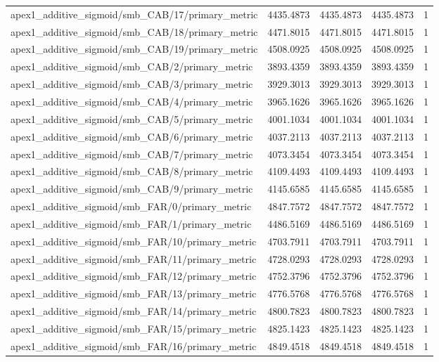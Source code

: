 \begin{table}[h]
\begin{tabular}{lrrrr}
apex1_additive_sigmoid/smb_CAB/17/primary_metric & 4435.4873 & 4435.4873 & 4435.4873 & 1 \\
apex1_additive_sigmoid/smb_CAB/18/primary_metric & 4471.8015 & 4471.8015 & 4471.8015 & 1 \\
apex1_additive_sigmoid/smb_CAB/19/primary_metric & 4508.0925 & 4508.0925 & 4508.0925 & 1 \\
apex1_additive_sigmoid/smb_CAB/2/primary_metric & 3893.4359 & 3893.4359 & 3893.4359 & 1 \\
apex1_additive_sigmoid/smb_CAB/3/primary_metric & 3929.3013 & 3929.3013 & 3929.3013 & 1 \\
apex1_additive_sigmoid/smb_CAB/4/primary_metric & 3965.1626 & 3965.1626 & 3965.1626 & 1 \\
apex1_additive_sigmoid/smb_CAB/5/primary_metric & 4001.1034 & 4001.1034 & 4001.1034 & 1 \\
apex1_additive_sigmoid/smb_CAB/6/primary_metric & 4037.2113 & 4037.2113 & 4037.2113 & 1 \\
apex1_additive_sigmoid/smb_CAB/7/primary_metric & 4073.3454 & 4073.3454 & 4073.3454 & 1 \\
apex1_additive_sigmoid/smb_CAB/8/primary_metric & 4109.4493 & 4109.4493 & 4109.4493 & 1 \\
apex1_additive_sigmoid/smb_CAB/9/primary_metric & 4145.6585 & 4145.6585 & 4145.6585 & 1 \\
apex1_additive_sigmoid/smb_FAR/0/primary_metric & 4847.7572 & 4847.7572 & 4847.7572 & 1 \\
apex1_additive_sigmoid/smb_FAR/1/primary_metric & 4486.5169 & 4486.5169 & 4486.5169 & 1 \\
apex1_additive_sigmoid/smb_FAR/10/primary_metric & 4703.7911 & 4703.7911 & 4703.7911 & 1 \\
apex1_additive_sigmoid/smb_FAR/11/primary_metric & 4728.0293 & 4728.0293 & 4728.0293 & 1 \\
apex1_additive_sigmoid/smb_FAR/12/primary_metric & 4752.3796 & 4752.3796 & 4752.3796 & 1 \\
apex1_additive_sigmoid/smb_FAR/13/primary_metric & 4776.5768 & 4776.5768 & 4776.5768 & 1 \\
apex1_additive_sigmoid/smb_FAR/14/primary_metric & 4800.7823 & 4800.7823 & 4800.7823 & 1 \\
apex1_additive_sigmoid/smb_FAR/15/primary_metric & 4825.1423 & 4825.1423 & 4825.1423 & 1 \\
apex1_additive_sigmoid/smb_FAR/16/primary_metric & 4849.4518 & 4849.4518 & 4849.4518 & 1 \\

\end{tabular}
\end{table}
